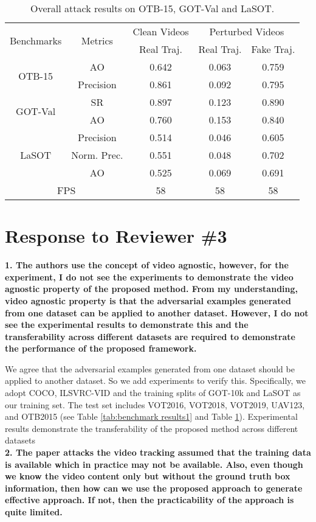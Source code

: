 \documentclass{article}
\begin{document}
\begin{table}[h]
    \centering
    \caption{Overall attack results on OTB-15, GOT-Val and LaSOT.}
    \begin{tabular}{c c | c | c | c}
    \toprule
    \multirow{2}{*}[-2pt]{Benchmarks} & \multirow{2}{*}[-2pt]{Metrics} & Clean Videos    & \multicolumn{2}{c}{Perturbed Videos}  \\
    \cmidrule{3-5}
                              &                         & Real Traj. & Real Traj. & Fake Traj.     \\ 
    \midrule
    \multirow{2}{*}{OTB-15} 
    & AO   & 0.642 & 0.063 & 0.759\\
    & Precision & 0.861 & 0.092 & 0.795\\
    \midrule
    \multirow{2}{*}{GOT-Val} 
    & SR & 0.897 & 0.123 & 0.890\\
    & AO & 0.760 & 0.153 & 0.840 \\
    \midrule
    \multirow{3}{*}{LaSOT} 
    & Precision  & 0.514 & 0.046 & 0.605\\
    & Norm. Prec.& 0.551 & 0.048 & 0.702\\
    & AO         & 0.525 & 0.069 & 0.691\\
    \midrule
    \multicolumn{2}{c|}{FPS} & 58 & 58 & 58\\
    \bottomrule
    \end{tabular}
    \label{tab:benchmark results}
  \end{table}

\section*{Response to Reviewer \#3}

\textbf{1. The authors use the concept of video agnostic, however, for the experiment, I do not see the experiments to demonstrate the video agnostic property of the proposed method. From my understanding, video agnostic property is that the adversarial examples generated from one dataset can be applied to another dataset. However, I do not see the experimental results to demonstrate this and the transferability across different datasets are required to demonstrate the performance of the proposed framework.}

We agree that the adversarial examples generated from one dataset should be applied to another dataset. So we add experiments to verify this. Specifically, we adopt COCO, ILSVRC-VID and the training splits of GOT-10k and LaSOT as our training set. The test set includes VOT2016, VOT2018, VOT2019, UAV123, and OTB2015 (see Table \ref{tab:benchmark results1} and Table \ref{tab:benchmark results}).
Experimental results demonstrate the transferability of the proposed method across different datasets
\\[6pt]
\noindent \textbf{2. The paper attacks the video tracking assumed that the training data is available which in practice may not be available. Also, even though we know the video content only but without the ground truth box information, then how can we use the proposed approach to generate effective approach. If not, then the practicability of the approach is quite limited.}
\end{document}
